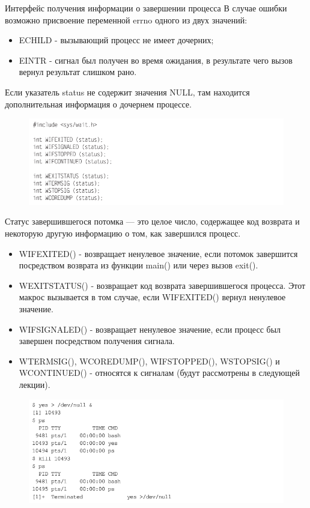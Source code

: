 \documentclass{beamer}
\begin{document}
\begin{frame}{Интерфейс получения информации о завершении процесса}
В случае ошибки возможно присвоение переменной errno одного из двух значений:
\begin{itemize}
\item ECHILD - вызывающий процесс не имеет дочерних;
\item EINTR - сигнал был получен во время ожидания, в результате чего вызов вернул
результат слишком рано.
\end{itemize}
Если указатель status не содержит значения NULL, там находится дополнительная
информация о дочернем процессе. 
\begin{figure}[h]
\centering
\includegraphics[scale=0.5]{images/lec07-pic13.png}
\end{figure}
\end{frame}

\begin{frame}
Статус завершившегося потомка — это целое число, содержащее код возврата и некоторую другую информацию о том, как завершился процесс.
\begin{itemize}
\item WIFEXITED() - возвращает ненулевое значение, если потомок завершится посредством возврата из функции main() или через вызов exit().
\item WEXITSTATUS() - возвращает код возврата завершившегося процесса. Этот макрос вызывается в том случае, если WIFEXITED() вернул ненулевое значение.
\item WIFSIGNALED() - возвращает ненулевое значение, если процесс был завершен
посредством получения сигнала. 
\item WTERMSIG(), WCOREDUMP(), WIFSTOPPED(), WSTOPSIG() и WCONTINUED() - относятся к сигналам (будут рассмотрены в следующей лекции).
\end{itemize}
\begin{figure}[h]
\centering
\includegraphics[scale=0.5]{images/lec07-pic42.png}
\end{figure}
\end{frame}
\end{document}
